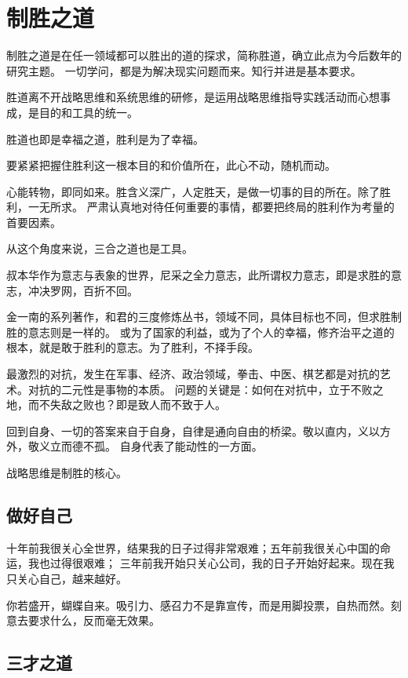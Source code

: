 \chapter{制胜之道}

制胜之道是在任一领域都可以胜出的道的探求，简称胜道，确立此点为今后数年的研究主题。
一切学问，都是为解决现实问题而来。知行并进是基本要求。

胜道离不开战略思维和系统思维的研修，是运用战略思维指导实践活动而心想事成，是目的和工具的统一。

胜道也即是幸福之道，胜利是为了幸福。

要紧紧把握住胜利这一根本目的和价值所在，此心不动，随机而动。

心能转物，即同如来。胜含义深广，人定胜天，是做一切事的目的所在。除了胜利，一无所求。
严肃认真地对待任何重要的事情，都要把终局的胜利作为考量的首要因素。

从这个角度来说，三合之道也是工具。

叔本华作为意志与表象的世界，尼采之全力意志，此所谓权力意志，即是求胜的意志，冲决罗网，百折不回。

金一南的系列著作，和君的三度修炼丛书，领域不同，具体目标也不同，但求胜制胜的意志则是一样的。
或为了国家的利益，或为了个人的幸福，修齐治平之道的根本，就是敢于胜利的意志。为了胜利，不择手段。

最激烈的对抗，发生在军事、经济、政治领域，拳击、中医、棋艺都是对抗的艺术。对抗的二元性是事物的本质。
问题的关键是：如何在对抗中，立于不败之地，而不失敌之败也？即是致人而不致于人。

回到自身、一切的答案来自于自身，自律是通向自由的桥梁。敬以直内，义以方外，敬义立而德不孤。
自身代表了能动性的一方面。

战略思维是制胜的核心。

\section{做好自己}

\begin{shadequote}

十年前我很关心全世界，结果我的日子过得非常艰难；五年前我很关心中国的命运，我也过得很艰难；
三年前我开始只关心公司，我的日子开始好起来。现在我只关心自己，越来越好。
\end{shadequote}

你若盛开，蝴蝶自来。吸引力、感召力不是靠宣传，而是用脚投票，自热而然。刻意去要求什么，反而毫无效果。

\section{三才之道}

